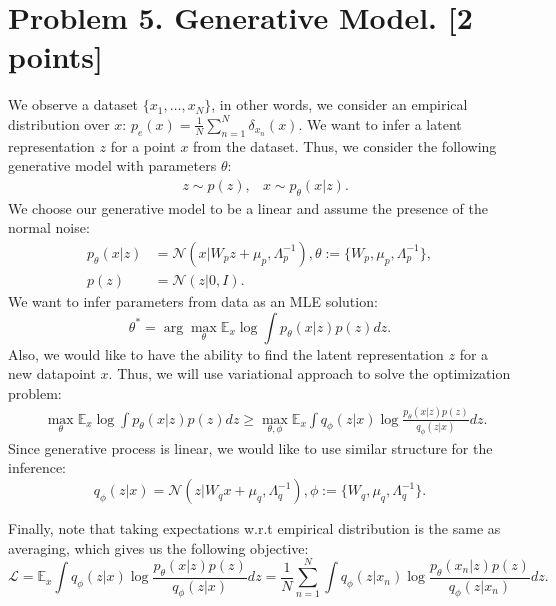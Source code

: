 \documentclass{article}
\begin{document}
\newpage
\section*{Problem 5. Generative Model. [2 points]}
We observe a dataset $\{x_1, \dots, x_N\}$, in other words, we consider an empirical distribution over $x$: $p_e(x)=\frac{1}{N}\sum_{n=1}^{N}\delta_{x_n}(x)$. We want to infer a latent representation $z$ for a point $x$ from the dataset. Thus, we consider the following generative model with parameters $\theta$:
\begin{equation}
    \begin{aligned}
    & z \sim p(z),
    & x \sim p_{\theta}(x|z).
    \end{aligned}
\end{equation}
We choose our generative model to be a linear and assume the presence of the normal noise:
\begin{align}
p_{\theta}(x|z)&=\mathcal{N}(x|W_pz+\mu_{p},\Lambda_{p}^{-1}),\theta:=\{W_p, \mu_p, \Lambda_{p}^{-1}\},\\
p(z)&=\mathcal{N}(z|0, I).
\end{align}
We want to infer parameters from data as an MLE solution:
\begin{equation}
\theta^{*} = \arg\max_{\theta}\mathbb{E}_{x}\log \int p_{\theta}(x|z)p(z)dz.
\end{equation}
Also, we would like to have the ability to find the latent representation $z$ for a new datapoint $x$. Thus, we will use variational approach to solve the optimization problem:
\begin{equation}
    \begin{aligned}
    &\max_{\theta}\mathbb{E}_{x}\log \int p_{\theta}(x|z)p(z)dz \geq \max_{\theta,\phi}\mathbb{E}_{x}\int q_{\phi}(z|x) \log \frac{p_{\theta}(x|z)p(z)}{q_{\phi}(z|x)}dz.
    \end{aligned}
\end{equation}
Since generative process is linear, we would like to use similar structure for the inference:
\begin{equation}
q_{\phi}(z|x)=\mathcal{N}(z|W_{q}x+\mu_{q},\Lambda_{q}^{-1}),\phi:=\{W_q, \mu_q, \Lambda_{q}^{-1}\}.
\end{equation}

Finally, note that taking expectations w.r.t empirical distribution is the same as averaging, which gives us the following objective:
\begin{equation}\label{eq:vae}
\mathcal{L} = \mathbb{E}_{x}\int q_{\phi}(z|x) \log \frac{p_{\theta}(x|z)p(z)}{q_{\phi}(z|x)}dz = \frac1N \sum_{n=1}^N \int q_{\phi}(z|x_n) \log \frac{p_{\theta}(x_n|z)p(z)}{q_{\phi}(z|x_n)}dz.
\end{equation}
\end{document}
